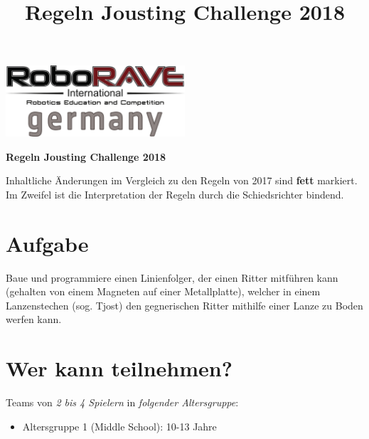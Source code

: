 \documentclass[a4paper,12pt]{article}
\begin{document}
\title{Regeln Jousting Challenge 2018}

 \begin{center}
\includegraphics[width=0.5\textwidth]{logo.png}

\huge                      %
\bfseries                   %
Regeln Jousting Challenge 2018
  \end{center}
  Inhaltliche Änderungen im Vergleich zu den Regeln von 2017 sind \textbf{fett} markiert. Im Zweifel ist die Interpretation der Regeln durch die Schiedsrichter bindend.
\section{Aufgabe}
Baue und programmiere einen Linienfolger, der einen Ritter mitführen kann
(gehalten von einem Magneten auf einer Metallplatte), welcher in einem
Lanzenstechen (sog. Tjost) den gegnerischen Ritter mithilfe einer
Lanze zu Boden werfen kann.
\section{Wer kann teilnehmen?}
Teams von \emph{2 bis 4 Spielern} in \emph{folgender Altersgruppe}:
\begin{itemize}
	\item Altersgruppe 1 (Middle School): 10-13 Jahre
\end{itemize}
\end{document}
